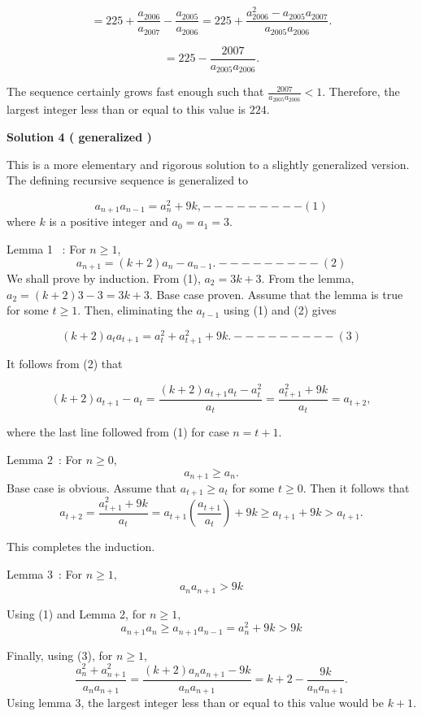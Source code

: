 \begin{enumerate}
 \[=225+\frac{a_{2006}}{a_{2007}}-\frac{a_{2005}}{a_{2006}}=225+\frac{a_{2006}^2-a_{2005}a_{2007}}{a_{2005}a_{2006}}.\]

 \[=225-\frac{2007}{a_{2005}a_{2006}}.\]

 The sequence certainly grows fast enough such that $\frac{2007}{a_{2005}a_{2006}}<1$. Therefore, the largest integer less than or equal to this value is $\boxed{224}$.

 



\textbf{Solution 4 ( generalized )}

This is a more elementary and rigorous solution to a slightly generalized version. The defining recursive sequence is generalized to 

 
 \[a_{n+1}a_{n-1} = a_n^2 + 9k, ---------(1)\]where $k$ is a positive integer and $a_0 = a_1 = 3.$

 Lemma 1  : For $n \geq 1$,
 \[a_{n+1} = ( k + 2)a_n - a_{n-1}. ---------(2)\]We shall prove by induction. From (1), $a_2 = 3k + 3$. From the lemma, $a_2 = (k + 2) 3 - 3 = 3k + 3.$ Base case proven. Assume that the lemma is true for some $t \geq 1$. Then, eliminating the $a_{t-1}$ using (1) and (2) gives

 
 \[(k+2)a_ta_{t+1} = a_t^2 + a_{t+1}^2 + 9k. ---------(3)\]

 It follows from (2) that 

 
 \[(k+2)a_{t+1} - a_t  =\frac{(k+2)a_{t+1}a_t - a_t^2}{a_t}  =\frac{a_{t+1}^2 + 9k}{a_t} =a_{t+2},\]

 where the last line followed from (1) for case $n = t+1$.

 Lemma 2 : For $n \geq 0,$
 \[a_{n+1} \geq a_{n}.\]Base case is obvious. Assume that $a_{t+1} \geq a_{t}$ for some $t \geq 0$. Then it follows that 
 \[a_{t+2} =\frac{a_{t+1}^2 + 9k}{a_t}  = a_{t+1}(\frac{a_{t+1}}{a_t} ) + 9k \geq a_{t+1} + 9k  > a_{t+1}.\]

 This completes the induction.

 Lemma 3 : For $n \geq 1,$
 \[a_n a_{n+1} > 9k\]

 Using (1) and Lemma 2, for $n \geq 1,$ 
 \[a_{n+1}a_n \geq a_{n+1}a_{n-1}  = a_n^2 + 9k  > 9k\]

 Finally, using (3), for $n \geq 1,$
 \[\frac{a_n^2 + a_{n+1}^2}{a_n a_{n+1}} =\frac{(k+2)a_n a_{n+1} - 9k}{a_n a_{n+1}} = k+2 -\frac{9k}{a_n a_{n+1}}.\]Using lemma 3, the largest integer less than or equal to this value would be $k + 1$.

 




\end{enumerate}
